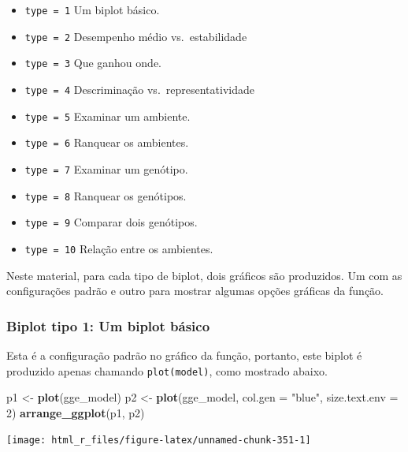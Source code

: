 \documentclass[
]{book}
\newenvironment{Shaded}{\begin{snugshade}}{\end{snugshade}}
\newcommand{\DataTypeTok}[1]{\textcolor[rgb]{0.13,0.29,0.53}{#1}}
\newcommand{\DecValTok}[1]{\textcolor[rgb]{0.00,0.00,0.81}{#1}}
\newcommand{\KeywordTok}[1]{\textcolor[rgb]{0.13,0.29,0.53}{\textbf{#1}}}
\newcommand{\NormalTok}[1]{#1}
\newcommand{\StringTok}[1]{\textcolor[rgb]{0.31,0.60,0.02}{#1}}
\providecommand{\tightlist}{%
  \setlength{\itemsep}{0pt}\setlength{\parskip}{0pt}}
\begin{document}
\begin{itemize}
\tightlist
\item
  \texttt{type\ =\ 1} Um biplot básico.
\item
  \texttt{type\ =\ 2} Desempenho médio vs.~estabilidade
\item
  \texttt{type\ =\ 3} Que ganhou onde.
\item
  \texttt{type\ =\ 4} Descriminação vs.~representatividade
\item
  \texttt{type\ =\ 5} Examinar um ambiente.
\item
  \texttt{type\ =\ 6} Ranquear os ambientes.
\item
  \texttt{type\ =\ 7} Examinar um genótipo.
\item
  \texttt{type\ =\ 8} Ranquear os genótipos.
\item
  \texttt{type\ =\ 9} Comparar dois genótipos.
\item
  \texttt{type\ =\ 10} Relação entre os ambientes.
\end{itemize}

Neste material, para cada tipo de biplot, dois gráficos são produzidos. Um com as configurações padrão e outro para mostrar algumas opções gráficas da função.

\hypertarget{biplot-tipo-1-um-biplot-buxe1sico}{%
\subsubsection{Biplot tipo 1: Um biplot básico}\label{biplot-tipo-1-um-biplot-buxe1sico}}

Esta é a configuração padrão no gráfico da função, portanto, este biplot é produzido apenas chamando \texttt{plot(model)}, como mostrado abaixo.

\begin{Shaded}
\begin{Highlighting}[]
\NormalTok{p1 <-}\StringTok{ }\KeywordTok{plot}\NormalTok{(gge_model)}
\NormalTok{p2 <-}\StringTok{ }\KeywordTok{plot}\NormalTok{(gge_model,}
           \DataTypeTok{col.gen =} \StringTok{"blue"}\NormalTok{,}
           \DataTypeTok{size.text.env =} \DecValTok{2}\NormalTok{)}
\KeywordTok{arrange_ggplot}\NormalTok{(p1, p2)}
\end{Highlighting}
\end{Shaded}

\begin{center}\texttt{[image: html\_r\_files/figure-latex/unnamed-chunk-351-1]} \end{center}
\end{document}
